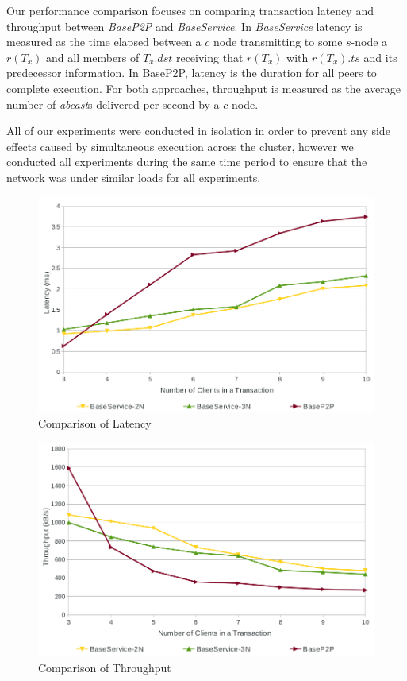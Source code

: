 Our performance comparison focuses on comparing transaction latency and throughput between \emph{BaseP2P} and \emph{BaseService}.  In \emph{BaseService} latency is measured as the time elapsed between a $c$ node transmitting to some $s$-node a $r(T_x)$  and all members of $T_x.dst$ receiving that $r(T_x)$ with $r(T_x).ts$ and its predecessor information. In BaseP2P, latency is the duration for all peers to complete execution. For both approaches, throughput is measured as the average number of \emph{abcast}s delivered per second by a $c$ node.

All of our experiments were conducted in isolation in order to prevent any side effects caused by simultaneous execution across the cluster, however we conducted all experiments during the same time period to ensure that the network was under similar loads for all experiments. 

\begin{figure}[htbp!]
 \includegraphics[width=\textwidth,height=\textheight,keepaspectratio]{latency}
 \caption{Comparison of Latency}
 \label{fig:LatencyGraph}
\end{figure}

\begin{figure}[htbp!]
 \includegraphics[width=\textwidth,height=\textheight,keepaspectratio]{throughput}
 \caption{Comparison of Throughput}
 \label{fig:ThroughputGraph}
\end{figure}

